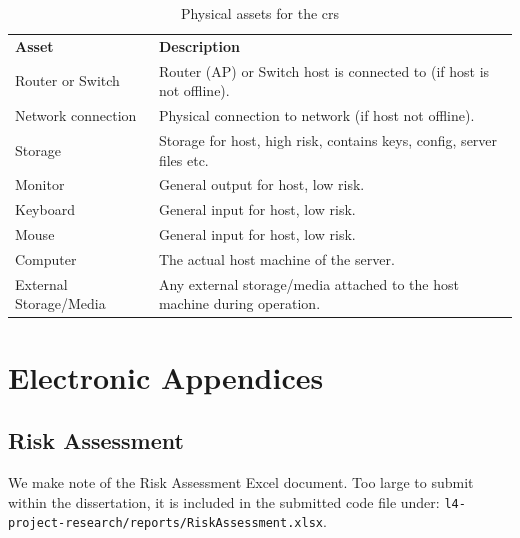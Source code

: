 \begin{appendices}
\begin{table}[htp]
  \begin{tabularx}{\linewidth}{lX}
    \textbf{Asset}          & \textbf{Description} \\
    Router or Switch        &	Router (AP) or Switch host is connected to (if host is not offline). \\
    Network connection      &	Physical connection to network (if host not offline). \\
    Storage                 &	Storage for host, high risk, contains keys, config, server files etc. \\
    Monitor                 &	General output for host, low risk. \\
    Keyboard                &	General input for host, low risk. \\
    Mouse                   &	General input for host, low risk. \\
    Computer                &	The actual host machine of the server. \\
    External Storage/Media  &	Any external storage/media attached to the host machine during operation. \\
  \end{tabularx}
  \caption{Physical assets for the \acrfull{crs}}
  \label{tab:physical_assets_cr}
\end{table}

\section{Electronic Appendices}
\label{appendix:electronic_appendices}

\subsection{Risk Assessment}
\label{appendix:risk_assessment}

We make note of the Risk Assessment Excel document. Too large to submit within the dissertation, it is included in the submitted code file under: \texttt{l4-project-research/reports/RiskAssessment.xlsx}.

\end{appendices}
